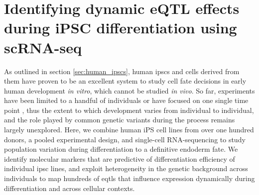 
\chapter{Identifying dynamic eQTL effects during iPSC differentiation using scRNA-seq}

As outlined in section \ref{sec:human_ipscs}, human \glspl{ipsc} and cells derived from them have proven to be an excellent system to study cell fate decisions in early human development \textit{in vitro}, which cannot be studied \textit{in vivo}.
So far, experiments have been limited to a handful of individuals \cite{} or have focused on one single time point \cite{kilpinen2017common, schwartzentruber2018molecular}, thus the extent to which development varies from individual to individual, and the role played by common genetic variants during the process remains largely unexplored.
Here, we combine human iPS cell lines from over one hundred donors, a pooled experimental design, and single-cell RNA-sequencing to study population variation during differentiation to a definitive endoderm fate. 
We identify molecular markers that are predictive of differentiation efficiency of individual \gls{ipsc} lines, and exploit heterogeneity in the genetic background across individuals to map hundreds of \glspl{eqtl} that influence expression dynamically during differentiation and across cellular contexts.\\

\newpage

